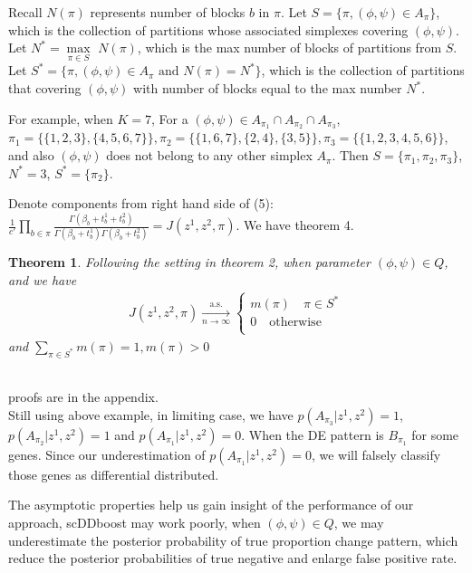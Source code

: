 \documentclass[11pt]{amsart}
\newtheorem{theorem}{Theorem}
\begin{document}
Recall $N(\pi)$ represents number of blocks $b$ in $\pi$. Let $S = \{\pi,  (\phi, \psi) \in A_\pi\}$, which is the collection of partitions whose associated simplexes covering $(\phi,\psi)$. Let $N^* = \underset{\pi\in S}\max$ $N(\pi)$, which is the max number of blocks of partitions from $S$. Let $S^* = \{\pi,  (\phi, \psi) \in A_\pi \text{ and } N(\pi) = N^*\}$, which is the collection of partitions that covering $(\phi, \psi)$ with number of blocks equal to the max number $N^*$. 

For example, when $K = 7$, For a $(\phi, \psi)\in A_{\pi_1} \cap A_{\pi_2} \cap A_{\pi_3}$, $\pi_1 = \{\{1,2,3\}, \{4,5,6,7\}\}, \pi_2 = \{\{1,6,7\}, \{2,4\},\{3,5\}\}, \pi_3 = \{\{1,2,3,4,5,6\}\}$, and also $(\phi, \psi)$ does not belong to any other simplex $A_\pi$. Then $S = \{\pi_1, \pi_2, \pi_3\}$, $N^* = 3$, $S^* = \{\pi_2\}.$ 

Denote components from right hand side of (5): $\frac{1}{c'}\underset{b\in \pi}\prod\frac{ \Gamma(\beta_b + t_b^1 + t_b^2)}{\Gamma(\beta_b + t_b^1)\Gamma(\beta_b + t_b^2)} = J(z^1,z^2,\pi).$  We have theorem 4.\\
\begin{theorem} Following the setting in theorem 2, when parameter $(\phi, \psi)\in Q$,  and we have 
\begin{eqnarray*}
    J(z^1,z^2,\pi) \xrightarrow[n\rightarrow\infty]{\text{a.s.}}\left\{
                \begin{array}{ll}
                 m(\pi) \quad  \pi \in S^* \\
                 0 \quad \text{otherwise}\\             
                \end{array}
              \right.
\end{eqnarray*}
and $\underset{\pi\in S^*}\sum m(\pi) = 1, m(\pi) > 0$\\
\end{theorem}\hfill\\
proofs are in the appendix.\\
Still using above example, in limiting case, we have $p(A_{\pi_3} | z^1, z^2) = 1$, $p(A_{\pi_2} | z^1, z^2) = 1$ and $p(A_{\pi_1}| z^1, z^2) = 0$. When the DE pattern is $B_{\pi_1}$ for some genes. Since our underestimation of $p(A_{\pi_1}| z^1, z^2) = 0$, we will falsely classify those genes as differential distributed.

The asymptotic properties help us gain insight of the performance of our approach,
scDDboost may work poorly, when $(\phi, \psi)\in Q$, we may underestimate the posterior probability of true proportion change pattern, which reduce the posterior probabilities of true negative and enlarge false positive rate.\\
\end{document}
